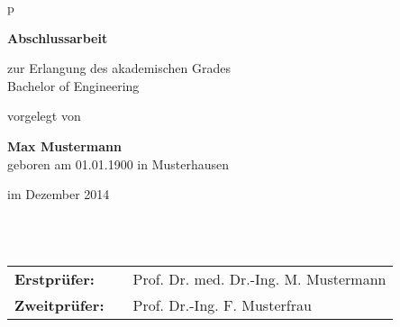 \begin{center}
\begin{tabular}{p{\textwidth}}


\begin{center}
\end{center}







\begin{center}
\textbf{\Large{Abschlussarbeit}}
\end{center}


\begin{center}
zur Erlangung des akademischen Grades\\
Bachelor of Engineering
\end{center}


\begin{center}
vorgelegt von
\end{center}

\begin{center}
\large{\textbf{Max Mustermann}} \\
\small{geboren am 01.01.1900 in Musterhausen}
\end{center}

\begin{center}
\large{im Dezember 2014}
\end{center}

\\

\\

\begin{center}
\begin{tabular}{lll}
\textbf{Erstprüfer:} & & Prof. Dr. med. Dr.-Ing. M. Mustermann\\
\textbf{Zweitprüfer:} & &Prof. Dr.-Ing. F. Musterfrau\\
\end{tabular}
\end{center}

\end{tabular}
\end{center}